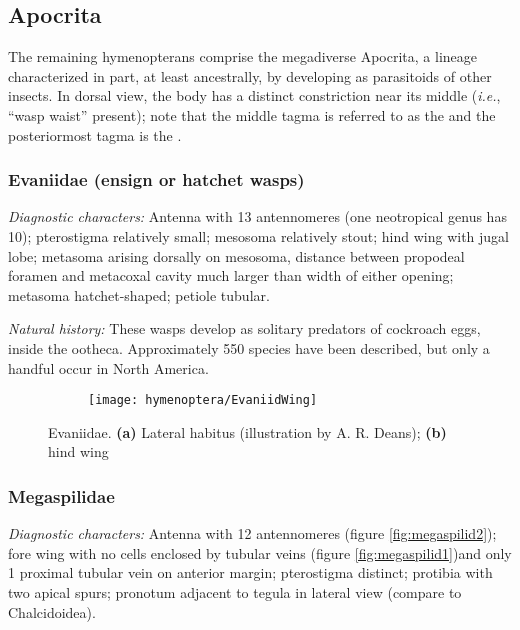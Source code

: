 \subsection{Apocrita}
The remaining hymenopterans comprise the megadiverse Apocrita, a lineage characterized in part, at least ancestrally, by developing as parasitoids of other insects. In dorsal view, the body has a distinct constriction near its middle (\textit{i.e.}, ``wasp waist'' present); note that the middle tagma is referred to as the  and the posteriormost tagma is the .

\subsubsection{Evaniidae (ensign or hatchet wasps)}
\noindent{}\textit{Diagnostic characters:} Antenna with 13 antennomeres (one neotropical genus has 10); pterostigma relatively small; mesosoma relatively stout; hind wing with jugal lobe; metasoma arising dorsally on mesosoma, distance between propodeal foramen and metacoxal cavity much larger than width of either opening; metasoma hatchet-shaped; petiole tubular.\vspace{3mm}

\noindent{}\textit{Natural history:} These wasps develop as solitary predators of cockroach eggs, inside the ootheca. Approximately 550 species have been described, but only a handful occur in North America.

\begin{figure}[ht!]
  \centering
\begin{subfigure}[ht!]{0.4\textwidth}
  \caption{}
  \label{fig:evaniid1}
\end{subfigure}
    \hfill
\begin{subfigure}[ht!]{0.45\textwidth}
    \texttt{[image: hymenoptera/EvaniidWing]}
  \caption{}
  \label{fig:evaniid2}
\end{subfigure}
    \caption{Evaniidae. \textbf{(a)} Lateral habitus (illustration by A. R. Deans); \textbf{(b)} hind wing \citep[][pg. 510]{goulet1993hymenoptera}}
    \label{fig:evaniid}
\end{figure}

\subsubsection{Megaspilidae}
\noindent{}\textit{Diagnostic characters:} Antenna with 12 antennomeres (figure \ref{fig:megaspilid2}); fore wing with no cells enclosed by tubular veins (figure \ref{fig:megaspilid1})and only 1 proximal tubular vein on anterior margin; pterostigma distinct; protibia with two apical spurs; pronotum adjacent to tegula in lateral view (compare to Chalcidoidea).\vspace{3mm}

